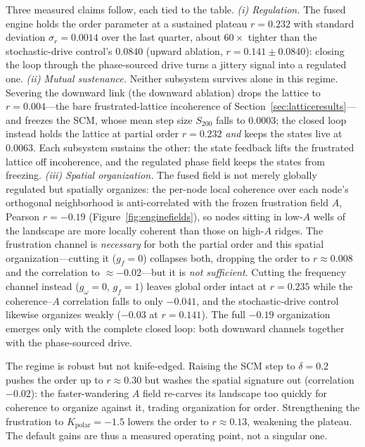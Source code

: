 \documentclass[11pt]{article}
\newcommand{\enRfull}{0.232}
\newcommand{\enRstdFull}{0.0014}
\newcommand{\enLiveFull}{0.0063}
\newcommand{\enCorrFull}{-0.19}
\newcommand{\enRdown}{0.004}
\newcommand{\enLiveDown}{0.0003}
\newcommand{\enRup}{0.141}
\newcommand{\enRstdUp}{0.0840}
\newcommand{\enCorrUp}{-0.03}
\newcommand{\enRfrustOnly}{0.235}
\newcommand{\enCorrFrustOnly}{-0.041}
\begin{document}
Three measured claims follow, each tied to the table. \emph{(i) Regulation.} The fused engine holds the order
parameter at a sustained plateau $r=\enRfull$ with standard deviation $\sigma_r=\enRstdFull$ over the last quarter,
about $60\times$ tighter than the stochastic-drive control's $\enRstdUp$ (upward ablation, $r=\enRup\pm\enRstdUp$):
closing the loop through the phase-sourced drive turns a jittery signal into a regulated one. \emph{(ii) Mutual
sustenance.} Neither subsystem survives alone in this regime. Severing the downward link (the downward ablation) drops
the lattice to $r=\enRdown$---the bare frustrated-lattice incoherence of Section~\ref{sec:latticeresults}---and freezes
the SCM, whose mean step size $S_{200}$ falls to $\enLiveDown$; the closed loop instead holds the lattice at partial
order $r=\enRfull$ \emph{and} keeps the states live at $\enLiveFull$. Each subsystem sustains the other: the state
feedback lifts the frustrated lattice off incoherence, and the regulated phase field keeps the states from freezing.
\emph{(iii) Spatial organization.} The fused field is not merely globally regulated but spatially organizes: the
per-node local coherence over each node's orthogonal neighborhood is anti-correlated with the frozen frustration field
$A$, Pearson $r=\enCorrFull$ (Figure~\ref{fig:enginefields}), so nodes sitting in low-$A$ wells of the landscape are
more locally coherent than those on high-$A$ ridges. The frustration channel is \emph{necessary} for both the partial
order and this spatial organization---cutting it ($g_f=0$) collapses both, dropping the order to $r\approx0.008$ and
the correlation to $\approx-0.02$---but it is \emph{not sufficient}. Cutting the frequency channel instead
($g_\omega=0$, $g_f=1$) leaves global order intact at $r=\enRfrustOnly$ while the coherence--$A$ correlation falls to
only $\enCorrFrustOnly$, and the stochastic-drive control likewise organizes weakly ($\enCorrUp$ at $r=\enRup$). The
full $\enCorrFull$ organization emerges only with the complete closed loop: both downward channels together with the
phase-sourced drive.

The regime is robust but not knife-edged. Raising the SCM step to $\delta{=}0.2$ pushes the order up to $r\approx0.30$
but washes the spatial signature out (correlation $-0.02$): the faster-wandering $A$ field re-carves its landscape too
quickly for coherence to organize against it, trading organization for order. Strengthening the frustration to
$K_{\mathrm{polar}}=-1.5$ lowers the order to $r\approx0.13$, weakening the plateau. The default gains are thus a
measured operating point, not a singular one.
\end{document}
